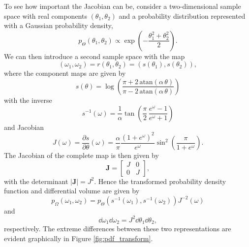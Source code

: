 To see how important the Jacobian can be, consider a two-dimensional 
sample space with real components $\left( \theta_{1}, \theta_{2} \right)$ 
and a probability distribution represented with a Gaussian probability density,
%
\begin{equation*}
p_{\Theta} \! \left( \theta_{1}, \theta_{2} \right)
\propto
\exp \! \left( - \frac{\theta_{1}^{2} + \theta_{2}^{2}}{2} \right).
\end{equation*}
%
We can then introduce a second sample space with the map
%
\begin{equation*}
\left( \omega_{1}, \omega_{2} \right) 
= 
r \! \left( \theta_{1}, \theta_{2} \right) 
= 
\left( s \! \left( \theta_{1} \right), s \! \left( \theta_{2} \right) \right),
\end{equation*}
%
where the component maps are given by
%
\begin{equation*}
s \! \left( \theta \right)
=
\log \! \left(
\frac{ \pi + 2 \, \mathrm{atan} \! \left( \alpha \, \theta \right) }
{ \pi - 2 \, \mathrm{atan} \! \left( \alpha \, \theta \right) }
\right)
\end{equation*}
%
with the inverse
%
\begin{equation*}
s^{-1} \! \left( \omega \right)
=
\frac{1}{\alpha} 
\tan \! \left(
\frac{\pi}{2} \, \frac{e^{\omega} - 1}{e^{\omega} + 1} \right)
\end{equation*}
%
and Jacobian
%
\begin{equation*}
J \! \left( \omega \right)
=
\frac{ \partial s }{ \partial \theta } \! \left( \omega \right)
=
\frac{\alpha}{\pi} \frac{ \left( 1 + e^{\omega} \right)^{2} }{ e^{\omega} }
\sin^{2} \! \left( \frac{ \pi }{ 1 + e^{\omega} } \right).
\end{equation*}
%
The Jacobian of the complete map is then given by
%
\begin{equation*}
\mathbf{J} = 
\begin{bmatrix}
J & 0 \\
0 & J
\end{bmatrix},
\end{equation*}
%
with the determinant $| \mathbf{J} | = J^{2}$.  Hence the transformed
probability density function and differential volume are given by
%
\begin{equation*}
p_{\Omega} \! \left( \omega_{1}, \omega_{2} \right)
=
p_{\Theta} \! \left( 
s^{-1} \! \left( \omega_{1} \right), 
s^{-1} \! \left( \omega_{2} \right) \right)
J^{-2} \! \left( \omega \right)
\end{equation*}
%
and
%
\begin{equation*}
\dd \omega_{1} \dd \omega_{2}
=
J^{2} \dd \theta_{1} \dd \theta_{2},
\end{equation*}
%
respectively.  The extreme differences between these two representations
are evident graphically in Figure \ref{fig:pdf_transform}.

